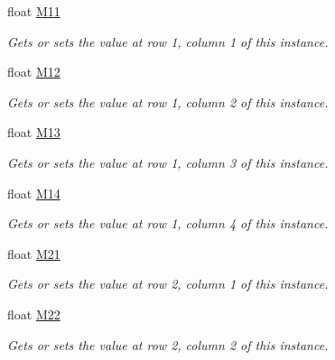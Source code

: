 \begin{DoxyCompactItemize}
float \hyperlink{struct_open_t_k_1_1_matrix4_aa259786339c04177b6d5718d48a56017}{M11}
\begin{DoxyCompactList}\small\item\em Gets or sets the value at row 1, column 1 of this instance. \end{DoxyCompactList}\item 
float \hyperlink{struct_open_t_k_1_1_matrix4_a6e50271d00973f34189215067b99cc59}{M12}
\begin{DoxyCompactList}\small\item\em Gets or sets the value at row 1, column 2 of this instance. \end{DoxyCompactList}\item 
float \hyperlink{struct_open_t_k_1_1_matrix4_ab22fd3db4c2335a90ff02f00d4215c79}{M13}
\begin{DoxyCompactList}\small\item\em Gets or sets the value at row 1, column 3 of this instance. \end{DoxyCompactList}\item 
float \hyperlink{struct_open_t_k_1_1_matrix4_a375c77b6bb356e904b4177543049f566}{M14}
\begin{DoxyCompactList}\small\item\em Gets or sets the value at row 1, column 4 of this instance. \end{DoxyCompactList}\item 
float \hyperlink{struct_open_t_k_1_1_matrix4_a8f67e786091e1e1c3bb2de5526f200e2}{M21}
\begin{DoxyCompactList}\small\item\em Gets or sets the value at row 2, column 1 of this instance. \end{DoxyCompactList}\item 
float \hyperlink{struct_open_t_k_1_1_matrix4_a0e052302d09a03c29a0acd5062be45de}{M22}
\begin{DoxyCompactList}\small\item\em Gets or sets the value at row 2, column 2 of this instance. \end{DoxyCompactList}\item 

\end{DoxyCompactItemize}

